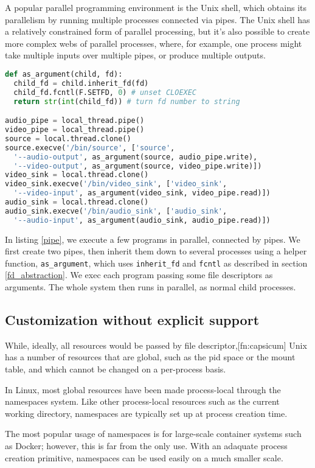 \documentclass{acmart}
\begin{document}
A popular parallel programming environment is the Unix shell,
which obtains its parallelism by running multiple processes connected via pipes.
The Unix shell has a relatively constrained form of parallel processing,
but it's also possible to create more complex webs of parallel processes,
where, for example, one process might take multiple inputs over multiple pipes,
or produce multiple outputs.
\begin{lstlisting}[float,language=Python,label={pipe},caption={Creating a parallel processing pipeline}]
def as_argument(child, fd):
  child_fd = child.inherit_fd(fd)
  child_fd.fcntl(F.SETFD, 0) # unset CLOEXEC
  return str(int(child_fd)) # turn fd number to string

audio_pipe = local_thread.pipe()
video_pipe = local_thread.pipe()
source = local.thread.clone()
source.execve('/bin/source', ['source',
  '--audio-output', as_argument(source, audio_pipe.write),
  '--video-output', as_argument(source, video_pipe.write)])
video_sink = local.thread.clone()
video_sink.execve('/bin/video_sink', ['video_sink',
  '--video-input', as_argument(video_sink, video_pipe.read)])
audio_sink = local.thread.clone()
audio_sink.execve('/bin/audio_sink', ['audio_sink',
  '--audio-input', as_argument(audio_sink, audio_pipe.read)])
\end{lstlisting}
In listing \ref{pipe},
we execute a few programs in parallel,
connected by pipes.
We first create two pipes,
then inherit them down to several processes using a helper function, \texttt{as_argument},
which uses \verb|inherit_fd| and \texttt{fcntl} as described in section \ref{fd_abstraction}.
We exec each program passing some file descriptors as arguments.
The whole system then runs in parallel,
as normal child processes.
\subsection{Customization without explicit support}
While, ideally, all resources would be passed by file descriptor,[fn:capsicum]
Unix has a number of resources that are global,
such as the pid space or the mount table,
and which cannot be changed on a per-process basis.

In Linux, most global resources have been made process-local
through the namespaces system.
Like other process-local resources such as the current working directory,
namespaces are typically set up at process creation time.

The most popular usage of namespaces is for large-scale container systems such as Docker;
however, this is far from the only use.
With an adaquate process creation primitive,
namespaces can be used easily on a much smaller scale.
\end{document}
